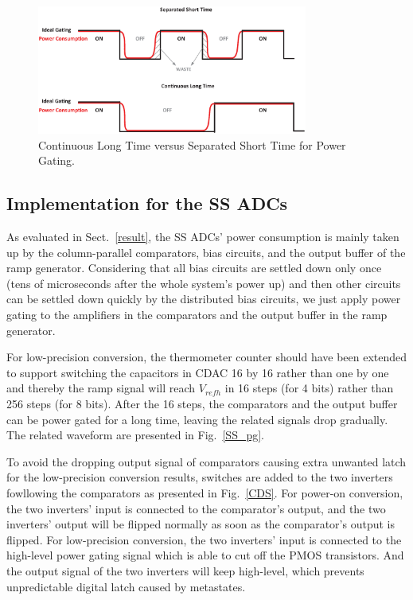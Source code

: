 \begin{figure}[htbp]
	\centerline{\includegraphics[width=3.5in]{./Figures/TIME.eps}}
	\caption{Continuous Long Time versus Separated Short Time for Power Gating.}
	\label{TIME}
\end{figure}  

\subsection{Implementation for the SS ADCs}

As evaluated in Sect.~\ref{result}, the SS ADCs’ power consumption is mainly taken up by the column-parallel comparators, bias circuits, and the output buffer of the ramp generator. 
Considering that all bias circuits are settled down only once (tens of microseconds after the whole system's power up) and then other circuits can be settled down quickly by the distributed 
bias circuits, we just apply power gating to the amplifiers in the comparators and the output buffer in the ramp generator.

For low-precision conversion, the thermometer counter should have been extended to support switching the capacitors in CDAC 16 by 16 rather than one by one and thereby the ramp signal will reach $V_{refh}$ in 16 steps (for 4 bits) rather than 256 steps (for 8 bits). 
After the 16 steps, the comparators and the output buffer can be power gated for a long time, leaving the related signals drop gradually.
The related waveform are presented in Fig.~\ref{SS_pg}. 

To avoid the dropping output signal of comparators causing extra unwanted latch for the low-precision conversion results, switches are added to the two inverters fowllowing the comparators as presented in Fig.~\ref{CDS}. For power-on conversion, the two inverters' input is connected to the comparator's output, and the two inverters' output will be flipped normally as soon as the comparator's output is flipped. For low-precision conversion, the two inverters' input is connected to the high-level power gating signal which is able to cut off the PMOS transistors. And the output signal of the two inverters will keep high-level, which prevents unpredictable digital latch caused by metastates.

